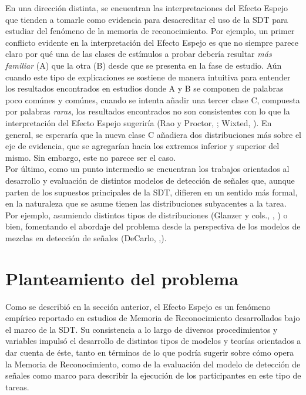En una dirección distinta, se encuentran las interpretaciones del Efecto Espejo que tienden a tomarle como evidencia para desacreditar el uso de la SDT para estudiar del fenómeno de la memoria de reconocimiento. Por ejemplo, un primer conflicto evidente en la interpretación del Efecto Espejo es que no siempre parece claro por qué una de las clases de estímulos a probar debería resultar \textit{más familiar} (A) que la otra (B) desde que se presenta en la fase de estudio. Aún cuando este tipo de explicaciones se sostiene de manera intuitiva para entender los resultados encontrados en estudios donde A y B se componen de palabras poco comúnes y comúnes, cuando se intenta añadir una tercer clase C, compuesta por palabras \textit{raras}, los resultados encontrados no son consistentes con lo que la interpretación del Efecto Espejo sugeriría (Rao y Proctor, \citeyear{Rao1984}; Wixted, \citeyear{Wixted1992}). En general, se esperaría que la nueva clase C añadiera dos distribuciones más sobre el eje de evidencia, que se agregarían hacia los extremos inferior y superior del mismo. Sin embargo, este no parece ser el caso.\\

Por último, como un punto intermedio se encuentran los trabajos orientados al desarrollo y evaluación de distintos modelos de detección de señales que, aunque parten de los supuestos principales de la SDT, difieren en un sentido más formal, en la naturaleza que se asume tienen las distribuciones subyacentes a la tarea. Por ejemplo, asumiendo distintos tipos de distribuciones (Glanzer y cols., \citeyear{Glanzer1993}, \citeyear{Glanzer2009}) o bien, fomentando el abordaje del problema desde la perspectiva de los modelos de mezclas en detección de señales (DeCarlo, \citeyear{DeCarlo2002} ,\citeyear{DeCarlo2007}).\\

\section{Planteamiento del problema}

Como se describió en la sección anterior, el Efecto Espejo es un fenómeno empírico reportado en estudios de Memoria de Reconocimiento desarrollados bajo el marco de la SDT. Su consistencia a lo largo de diversos procedimientos y variables impulsó el desarrollo de distintos tipos de modelos y teorías orientados a dar cuenta de éste, tanto en términos de lo que podría sugerir sobre cómo opera la Memoria de Reconocimiento, como de la evaluación del modelo de detección de señales como marco para describir la ejecución de los participantes en este tipo de tareas.\\

